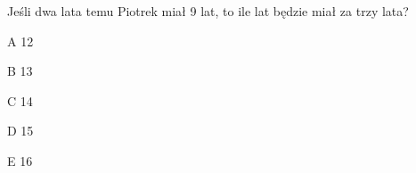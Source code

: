 \begin{tresc}
Jeśli dwa lata temu Piotrek miał 9 lat, to ile lat będzie miał za trzy lata?
\end{tresc}
\begin{wariant}{A} 12 \end{wariant}
\begin{wariant}{B} 13 \end{wariant}
\begin{wariant}{C} 14 \end{wariant}
\begin{wariant}{D} 15 \end{wariant}
\begin{wariant}{E} 16 \end{wariant}

